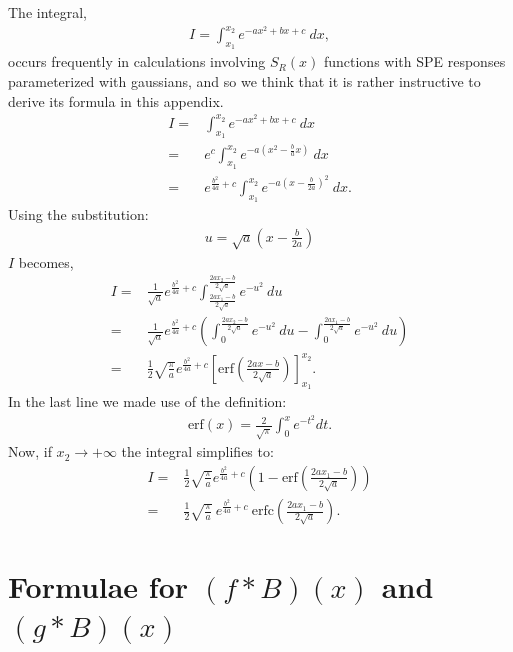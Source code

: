 \documentclass[a4paper,11pt]{article}
\begin{document}
The integral, 
\begin{align}
I = \int_{ x_1 }^{x_2}  e^{-a x^2 +b x +c } \ dx,
\end{align}
occurs frequently in calculations involving $S_R(x)$ functions with SPE responses parameterized with gaussians, and so we think that it is rather instructive to derive its formula in this appendix. 
\begin{align}
I = & \int_{ x_1 }^{x_2}  e^{-a x^2 +b x +c } \ dx \nonumber \\
  = & e^c \int_{ x_1 }^{x_2}  e^{-a ( x^2 - \frac{b}{a} x )} \ dx  \nonumber \\
  = & e^{\frac{b^2}{4a}+c} \int_{ x_1 }^{x_2}  e^{-a ( x - \frac{b}{2a} )^2} \ dx. 
\end{align}
Using the substitution: 
\begin{align}
u = \sqrt{a} ( x - \frac{b}{2a} )  
\end{align}
$I$ becomes,
\begin{align}
I = &  \frac{1}{\sqrt{a}} e^{\frac{b^2}{4a}+c} \int_{ \frac{2a x_1 -b }{2\sqrt{a}} }^{ \frac{2a x_2 -b }{2\sqrt{a}} }  e^{-u^2 } \ du \nonumber \\
  = & \frac{1}{\sqrt{a}} e^{\frac{b^2}{4a}+c} \left(   \int_{ 0 }^{ \frac{2a x_2 -b }{2\sqrt{a}} }  e^{-u^2 } \ du -  \int^{ \frac{2a x_1 -b }{2\sqrt{a}} }_{ 0 }  e^{-u^2 } \ du\right)  \nonumber \\
  = &  \frac{1}{2}  \sqrt{\frac{\pi}{a} } e^{\frac{b^2}{4a}+c} \left[ \text{erf}\left({ \frac{2a x -b }{2\sqrt{a}} }\right) \right]^{ x_2 }_{ x_1 }.
\end{align}
In the last line we made use of the definition:
\begin{align}
 \text{erf}(x) = \frac{2}{\sqrt{\pi}} \int_0^x e^{-t^2} dt. 
 \end{align}
 Now, if $x_2\rightarrow +\infty$ the integral simplifies to:
 \begin{align}
I = &  \frac{1}{2}  \sqrt{\frac{\pi}{a} } e^{\frac{b^2}{4a}+c} \left( 1 - \text{erf}\left({ \frac{2a x_1 -b }{2\sqrt{a}} }\right) \right) \nonumber \\
  = & \frac{1}{2}  \sqrt{\frac{\pi}{a} } \ e^{\frac{b^2}{4a}+c} \ \text{erfc}\left({ \frac{2a x_1 -b }{2\sqrt{a}} }\right). \label{eq:intg}
\end{align}


\section{Formulae for $(f*B)(x)$ and $(g*B)(x)$}
\label{app:sr1}
%
\end{document}
